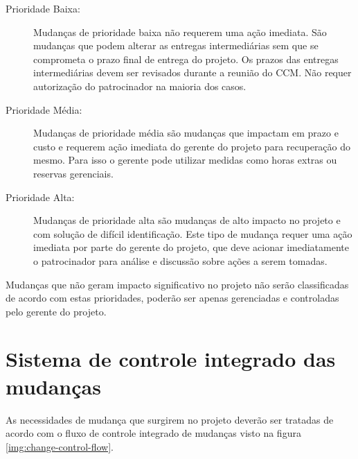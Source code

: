 \begin{description}
	\item[Prioridade Baixa:] Mudanças de prioridade baixa não requerem uma ação imediata. São mudanças que podem alterar as entregas intermediárias sem que se comprometa o prazo final de entrega do projeto. Os prazos das entregas intermediárias devem ser revisados durante a reunião do CCM. Não requer autorização do patrocinador na maioria dos casos.
	\item[Prioridade Média:] Mudanças de prioridade média são mudanças que impactam em prazo e custo e requerem ação imediata do gerente do projeto para recuperação do mesmo. Para isso o gerente pode utilizar medidas como horas extras ou reservas gerenciais.
	\item[Prioridade Alta:] Mudanças de prioridade alta são mudanças de alto impacto no projeto e com solução de difícil identificação. Este tipo de mudança requer uma ação imediata por parte do gerente do projeto, que deve acionar imediatamente o patrocinador para análise e discussão sobre ações a serem tomadas.
\end{description}

Mudanças que não geram impacto significativo no projeto não serão classificadas de acordo com estas prioridades, poderão ser apenas gerenciadas e controladas pelo gerente do projeto.

\section{Sistema de controle integrado das mudanças}
\label{sec:change-control-system}

As necessidades de mudança que surgirem no projeto deverão ser tratadas de acordo com o fluxo de controle integrado de mudanças visto na figura \ref{img:change-control-flow}.

